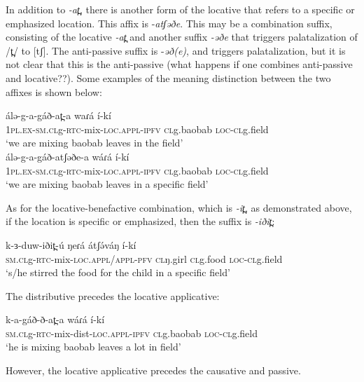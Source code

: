 In addition to \textit{-at̪}, there is another form of the locative that refers to a specific or emphasized location. This affix is -\textit{atʃəðe}. This may be a combination suffix, consisting of the locative \textit{-at̪} and another suffix \textit{-əðe} that triggers palatalization of /t̪/ to [tʃ]. The anti-passive suffix is -\textit{əð(e)}, and triggers palatalization, but it is not clear that this is the anti-passive (what happens if one combines anti-passive and locative??). Some examples of the meaning distinction between the two affixes is shown below:

\ea
\ea \gll 	 álə-g-a-gáð-at̪-a 				waɾá 		í-kí\\	
	1\textsc{pl.ex}-\textsc{sm.cl}g-\textsc{rtc}-mix-\textsc{loc.appl-\textsc{ipfv}}	\textsc{cl}g.baobab	\textsc{loc-cl}g.field\\
	\trans ‘we are mixing baobab leaves in the field’\\
		
\ex \gll	álə-g-a-gáð-atʃəðe-a 			wáɾá 		í-kí\\		
1\textsc{pl.ex}-\textsc{sm.cl}g-\textsc{rtc}-mix-\textsc{loc.appl-\textsc{ipfv}}	\textsc{cl}g.baobab	\textsc{loc-cl}g.field\\
	\trans‘we are mixing baobab leaves in a specific field’\\
\z
\z

As for the locative-benefactive combination, which is \textit{-it̪}, as demonstrated above, if the location is specific or emphasized, then the suffix is \textit{-iðit̪}:

\ea
\gll k-ɜ-duw-iðit̪-ú 				ŋeɾá 	  átʃə́váŋ 	í-kí	\\
\textsc{sm.cl}g-\textsc{rtc}-mix-\textsc{loc.appl/appl-\textsc{pfv}}	\textsc{cl}ŋ.girl	  \textsc{cl}g.food	\textsc{loc-cl}g.field\\
\trans ‘s/he stirred the food for the child in a specific field’\\
\z

The distributive precedes the locative applicative:

\ea
 \gll k-a-gáð-ð-at̪-a			wáɾá 		í-kí\\
	\textsc{sm.cl}g-\textsc{rtc}-mix-dist-\textsc{loc.appl-\textsc{ipfv}}	\textsc{cl}g.baobab	\textsc{loc-cl}g.field	\\	
		\trans ‘he is mixing baobab leaves a lot in field’ \\
\z

However, the locative applicative precedes the causative and passive. 

